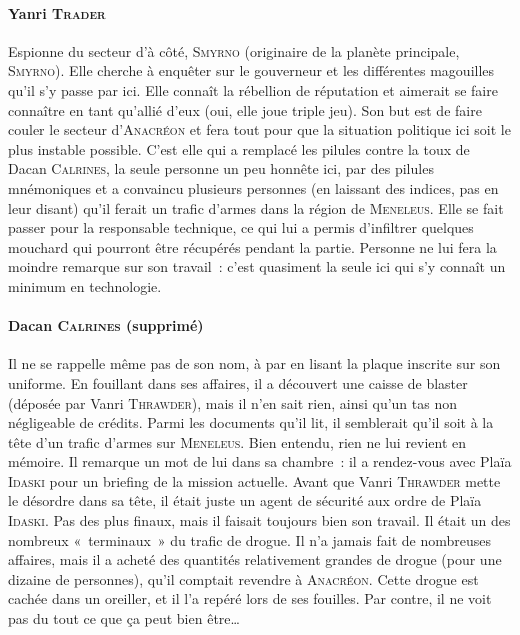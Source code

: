 {\paragraph{Yanri \textsc{Trader}}
{
Espionne du secteur d’à côté, \textsc{Smyrno} (originaire de la planète principale, \textsc{Smyrno}).
Elle cherche à enquêter sur le gouverneur et les différentes magouilles qu’il s’y passe par ici.
Elle connaît la rébellion de réputation et aimerait se faire connaître en tant qu’allié d’eux (oui, elle joue triple jeu).
Son but est de faire couler le secteur d’\textsc{Anacréon} et fera tout pour que la situation politique ici soit le plus instable possible.
C’est elle qui a remplacé les pilules contre la toux de Dacan \textsc{Calrines}, la seule personne un peu honnête ici, par des pilules mnémoniques et a convaincu plusieurs personnes (en laissant des indices, pas en leur disant) qu’il ferait un trafic d’armes dans la région de \textsc{Meneleus}.
Elle se fait passer pour la responsable technique, ce qui lui a permis d’infiltrer quelques mouchard qui pourront être récupérés pendant la partie.
Personne ne lui fera la moindre remarque sur son travail~: c’est quasiment la seule ici qui s’y connaît un minimum en technologie.
}

\paragraph{Dacan \textsc{Calrines} (supprimé)}
{
Il ne se rappelle même pas de son nom, à par en lisant la plaque inscrite sur son uniforme.
En fouillant dans ses affaires, il a découvert une caisse de blaster (déposée par Vanri \textsc{Thrawder}), mais il n’en sait rien, ainsi qu’un tas non négligeable de crédits.
Parmi les documents qu’il lit, il semblerait qu’il soit à la tête d’un trafic d’armes sur \textsc{Meneleus}.
Bien entendu, rien ne lui revient en mémoire.
Il remarque un mot de lui dans sa chambre~: il a rendez-vous avec Plaïa \textsc{Idaski} pour un briefing de la mission actuelle.
Avant que Vanri \textsc{Thrawder} mette le désordre dans sa tête, il était juste un agent de sécurité aux ordre de Plaïa \textsc{Idaski}.
Pas des plus finaux, mais il faisait toujours bien son travail.
Il était un des nombreux «~terminaux~» du trafic de drogue.
Il n’a jamais fait de nombreuses affaires, mais il a acheté des quantités relativement grandes de drogue (pour une dizaine de personnes), qu’il comptait revendre à \textsc{Anacréon}.
Cette drogue est cachée dans un oreiller, et il l’a repéré lors de ses fouilles.
Par contre, il ne voit pas du tout ce que ça peut bien être\ldots
}

\newpage
}

